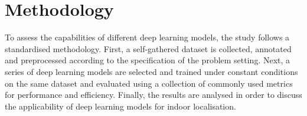 \documentclass[a4paper]{article}
\begin{document}

% 
% 
% 
% 
% 
% 
% 
% 



\section{Methodology} %
\label{sec:methodology}

To assess the capabilities of different deep learning models, the study follows
a standardised methodology. First, a self-gathered dataset is collected,
annotated and preprocessed according to the specification of the problem
setting. Next, a series of deep learning models are selected and trained under
constant conditions on the same dataset and evaluated using a collection of
commonly used metrics for performance and efficiency. Finally, the results are
analysed in order to discuss the applicability of deep learning models for
indoor localisation.
\end{document}

